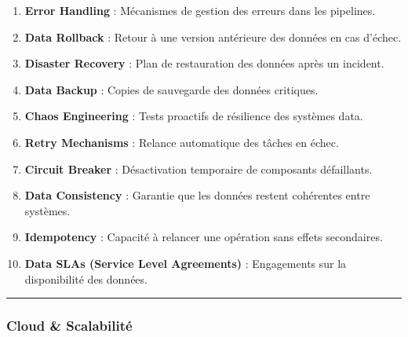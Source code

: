 \documentclass[
  letterpaper,
  DIV=11,
  numbers=noendperiod]{scrartcl}
\providecommand{\tightlist}{%
  \setlength{\itemsep}{0pt}\setlength{\parskip}{0pt}}\usepackage{longtable,booktabs,array}
\begin{document}
\begin{enumerate}
\def\labelenumi{\arabic{enumi}.}
\setcounter{enumi}{60}
\tightlist
\item
  \textbf{Error Handling} : Mécanismes de gestion des erreurs dans les
  pipelines.\\
\item
  \textbf{Data Rollback} : Retour à une version antérieure des données
  en cas d'échec.\\
\item
  \textbf{Disaster Recovery} : Plan de restauration des données après un
  incident.\\
\item
  \textbf{Data Backup} : Copies de sauvegarde des données critiques.\\
\item
  \textbf{Chaos Engineering} : Tests proactifs de résilience des
  systèmes data.\\
\item
  \textbf{Retry Mechanisms} : Relance automatique des tâches en échec.\\
\item
  \textbf{Circuit Breaker} : Désactivation temporaire de composants
  défaillants.\\
\item
  \textbf{Data Consistency} : Garantie que les données restent
  cohérentes entre systèmes.\\
\item
  \textbf{Idempotency} : Capacité à relancer une opération sans effets
  secondaires.\\
\item
  \textbf{Data SLAs (Service Level Agreements)} : Engagements sur la
  disponibilité des données.
\end{enumerate}

\begin{center}\rule{0.5\linewidth}{0.5pt}\end{center}

\subsubsection{\texorpdfstring{\textbf{Cloud \&
Scalabilité}}{Cloud \& Scalabilité}}\label{cloud-scalabilituxe9}
\end{document}
